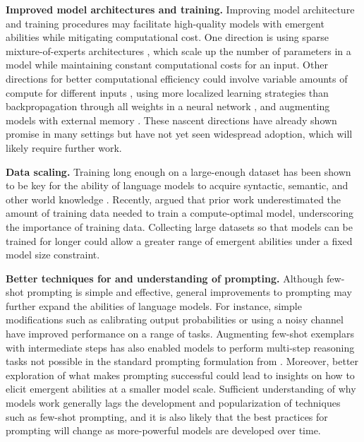 \documentclass[10pt]{article} %
\begin{document}
\vspace{1mm}
\noindent
\textbf{Improved model architectures and training.}
Improving model architecture and training procedures may facilitate high-quality models with emergent abilities while mitigating computational cost.
One direction is using sparse mixture-of-experts architectures \citep{lepikhin2020gshard,fedus2021switch,artetxe2021efficient,zoph2022designing}, which scale up the number of parameters in a model while maintaining constant computational costs for an input.
Other directions for better computational efficiency could involve variable amounts of compute for different inputs \citep{graves2016adaptive,dehghani2018universal}, using more localized learning strategies than backpropagation through all weights in a neural network \citep{jaderberg2017decoupled}, and augmenting models with external memory \citep[][\textit{inter alia}]{guu2020realm,borgeaud2021improving,wu2022memorizing}.
These nascent directions have already shown promise in many settings but have not yet seen widespread adoption, which will likely require further work.

\vspace{1mm}
\noindent
\textbf{Data scaling.}
Training long enough on a large-enough dataset has been shown to be key for the ability of language models to acquire syntactic, semantic, and other world knowledge \citep{zhang-etal-2021-need,wei-etal-2021-frequency,razeghi2022impact}.
Recently, \citet{hoffmann2022training} argued that prior work \citep{kaplan2020scaling} underestimated the amount of training data needed to train a compute-optimal model, underscoring the importance of training data.
Collecting large datasets so that models can be trained for longer could allow a greater range of emergent abilities under a fixed model size constraint.

\vspace{1mm}
\noindent
\textbf{Better techniques for and understanding of prompting.}
Although few-shot prompting \citep{brown2020language} is simple and effective, general improvements to prompting may further expand the abilities of language models.
For instance, simple modifications such as calibrating output probabilities \citep{zhao2021calibrate,holtzman-etal-2021-surface} or using a noisy channel \citep{min2021noisy} have improved performance on a range of tasks.
Augmenting few-shot exemplars with intermediate steps \citep{reynolds2021prompt,nye2021show,wei2022chain} has also enabled models to perform multi-step reasoning tasks not possible in the standard prompting formulation from \citet{brown2020language}.
Moreover, better exploration of what makes prompting successful \citep{wei2021pretrained,xie2021explanation,min2022rethinking,olsson2022induction} could lead to insights on how to elicit emergent abilities at a smaller model scale.
Sufficient understanding of why models work generally lags the development and popularization of techniques such as few-shot prompting, and it is also likely that the best practices for prompting will change as more-powerful models are developed over time.
\end{document}
